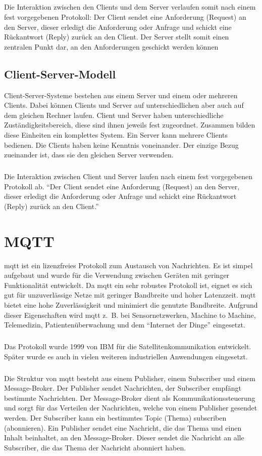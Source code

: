 \subparagraph{}
Die Interaktion zwischen den Clients und
dem Server verlaufen somit nach einem fest vorgegebenen Protokoll: Der Client
sendet eine Anforderung (Request) an den Server, dieser erledigt die Anforderung
oder Anfrage und schickt eine Rückantwort (Reply) zurück an den Client. Der
Server stellt somit einen zentralen Punkt dar, an den Anforderungen geschickt
werden können
\cite{Bengel2015}

\subsection{Client-Server-Modell}
Client-Server-Systeme bestehen aus einem Server und einem oder mehreren Clients.
Dabei können Clients und Server auf unterschiedlichen aber auch auf dem gleichen
Rechner laufen. Client und Server haben unterschiedliche Zuständigkeitsbereich,
diese sind ihnen jeweils fest zugeordnet. Zusammen bilden diese Einheiten ein
komplettes System. Ein Server kann mehrere Clients bedienen. Die Clients haben
keine Kenntnis voneinander. Der einzige Bezug zueinander ist, dass sie den
gleichen Server verwenden.

\subparagraph{}
Die Interaktion zwischen Client und Server laufen nach einem fest vorgegebenen
Protokoll ab. "`Der Client sendet eine Anforderung (Request) an den Server,
dieser erledigt die Anforderung oder Anfrage und schickt eine Rückantwort
(Reply) zurück an den Client."'
\cite{Bengel2015}

\section{MQTT}\label{sec:mqtt}
\ac{mqtt} ist ein lizenzfreies Protokoll zum Austausch von Nachrichten. Es ist
simpel aufgebaut und wurde für die Verwendung zwischen Geräten mit geringer
Funktionalität entwickelt. Da \ac{mqtt} ein sehr robustes Protokoll ist, eignet
es sich gut für unzuverlässige Netze mit geringer Bandbreite und hoher
Latenzzeit. \ac{mqtt} bietet eine hohe Zuverlässigkeit und minimiert die
genutzte Bandbreite. Aufgrund dieser Eigenschaften wird \ac{mqtt} z.~B.
bei Sensornetzwerken, Machine to Machine, Telemedizin, Patientenüberwachung und
dem "`Internet der Dinge"' eingesetzt.

\subparagraph{}
Das Protokoll wurde 1999 von IBM für die
Satellitenkommunikation entwickelt. Später wurde es auch in vielen weiteren
industriellen Anwendungen eingesetzt.

\subparagraph{}
Die Struktur von \ac{mqtt} besteht aus einem Publisher, einem Subscriber
und einem Message-Broker. Der Publisher sendet Nachrichten, der Subscriber
empfängt bestimmte Nachrichten. Der Message-Broker dient als
Kommunikationssteuerung und sorgt für das Verteilen der Nachrichten, welche von
einem Publisher gesendet werden. Der Subscriber kann ein bestimmtes Topic
(Thema) subscriben (abonnieren). Ein Publisher sendet eine Nachricht, die das
Thema und einen Inhalt beinhaltet, an den Message-Broker. Dieser sendet die
Nachricht an alle Subscriber, die das Thema der Nachricht abonniert haben.
\cite{dennisseidel2018}
